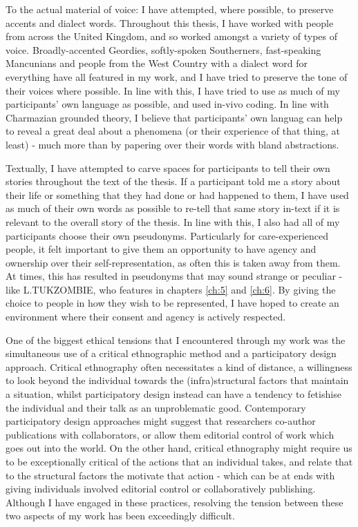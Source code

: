 To the actual material of voice: I have attempted, where possible, to preserve accents and dialect words. Throughout this thesis, I have worked with people from across the United Kingdom, and so worked amongst a variety of types of voice. Broadly-accented Geordies, softly-spoken Southerners, fast-speaking Mancunians and people from the West Country with a dialect word for everything have all featured in my work, and I have tried to preserve the tone of their voices where possible. In line with this, I have tried to use as much of my participants' own language as possible, and used in-vivo coding. In line with Charmazian grounded theory, I believe that participants' own languag can help to reveal a great deal about a phenomena (or their experience of that thing, at least) - much more than by papering over their words with bland abstractions.   

Textually, I have attempted to carve spaces for participants to tell their own stories throughout the text of the thesis. If a participant told me a story about their life or something that they had done or had happened to them, I have used as much of their own words as possible to re-tell that same story in-text if it is relevant to the overall story of the thesis. In line with this, I also had all of my participants choose their own pseudonyms. Particularly for care-experienced people, it felt important to give them an opportunity to have agency and ownership over their self-representation, as often this is taken away from them. At times, this has resulted in pseudonyms that may sound strange or peculiar - like L.TUKZOMBIE, who features in chapters \ref{ch:5} and \ref{ch:6}. By giving the choice to people in how they wish to be represented, I have hoped to create an environment where their consent and agency is actively respected.

One of the biggest ethical tensions that I encountered through my work was the simultaneous use of a critical ethnographic method and a participatory design approach. Critical ethnography often necessitates a kind of distance, a willingness to look beyond the individual towards the (infra)structural factors that maintain a situation, whilst participatory design instead can have a tendency to fetishise the individual and their talk as an unproblematic good. Contemporary participatory design approaches might suggest that researchers co-author publications with collaborators, or allow them editorial control of work which goes out into the world. On the other hand, critical ethnography might require us to be exceptionally critical of the actions that an individual takes, and relate that to the structural factors the motivate that action - which can be at ends with giving individuals involved editorial control or collaboratively publishing. Although I have engaged in these practices, resolving the tension between these two aspects of my work has been exceedingly difficult.

